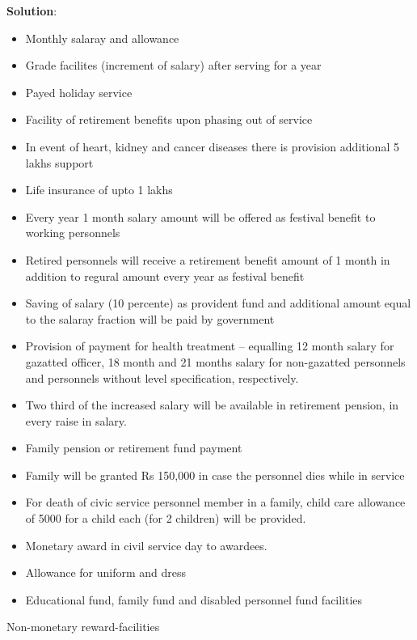 \documentclass[
]{book}
\newenvironment{solution}{ {\bfseries Solution}:}{}
\begin{document}
\begin{questions}
\begin{solution}
\begin{itemize}
\item Monthly salaray and allowance
\item Grade facilites (increment of salary) after serving for a year
\item Payed holiday service
\item Facility of retirement benefits upon phasing out of service
\item In event of heart, kidney and cancer diseases there is provision additional 5 lakhs support
\item Life insurance of upto 1 lakhs
\item Every year 1 month salary amount will be offered as festival benefit to working personnels
\item Retired personnels will receive a retirement benefit amount of 1 month in addition to regural amount every year as festival benefit
\item Saving of salary (10 percente) as provident fund and additional amount equal to the salaray fraction will be paid by government
\item Provision of payment for health treatment -- equalling 12 month salary for gazatted officer, 18 month and 21 months salary for non-gazatted personnels and personnels without level specification, respectively.
\item Two third of the increased salary will be available in retirement pension, in every raise in salary.
\item Family pension or retirement fund payment
\item Family will be granted Rs 150,000 in case the personnel dies while in service
\item For death of civic service personnel member in a family, child care allowance of 5000 for a child each (for 2 children) will be provided.
\item Monetary award in civil service day to awardees.
\item Allowance for uniform and dress
\item Educational fund, family fund and disabled personnel fund facilities
\end{itemize}

Non-monetary reward-facilities


\end{solution}
\end{questions}
\end{document}
